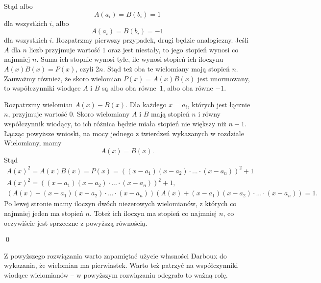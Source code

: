 \noindent
Stąd albo
\[
	A(a_i) = B(b_i) = 1
\]
dla wszystkich $i$, albo
\[
	A(a_i) = B(b_i) = -1
\]
dla wszystkich $i$.
Rozpatrzmy pierwszy przypadek, drugi będzie analogiczny.
Jeśli $A$ dla $n$ liczb przyjmuje wartość $1$ oraz jest niestały, to jego stopień wynosi co najmniej $n$. Suma ich stopnie wynosi tyle, ile wynosi stopień ich iloczynu $A(x)B(x) = P(x)$, czyli $2n$. Stąd też oba te wielomiany mają stopień $n$. Zauważmy również, że skoro wielomian $P(x) = A(x)B(x)$ jest unormowany, to współczynniki wiodące $A$ i $B$ są albo oba równe~$1$, albo oba równe $-1$.

\vspace{10px}
\noindent
Rozpatrzmy wielomian $A(x) - B(x)$. Dla każdego $x = a_i$, których jest łącznie $n$, przyjmuje wartość $0$. Skoro wielomiany $A$ i $B$ mają stopień $n$ i równy współczynnik wiodący, to ich różnica będzie miała stopień nie większy niż $n - 1$. Łącząc powyższe wnioski, na mocy jednego z twierdzeń wykazanych w rozdziale Wielomiany, mamy 
\[
	A(x) = B(x).
\]
Stąd
\begin{gather*}
	A(x)^2 = A(x)B(x) = P(x) = ((x − a_1)(x − a_2)\cdot ...\cdot (x − a_n))^2 + 1 \\
	A(x)^2 = ((x − a_1)(x − a_2)\cdot ...\cdot (x − a_n))^2 + 1, \\
	\left(A(x) - (x − a_1)(x − a_2)\cdot ...\cdot (x − a_n)\right)\left(A(x) + (x − a_1)(x − a_2)\cdot ...\cdot (x − a_n)\right) = 1.
\end{gather*}
Po lewej stronie mamy iloczyn dwóch niezerowych wielomianów, z których co najmniej jeden ma stopień $n$. Toteż ich iloczyn ma stopień co najmniej $n$, co oczywiście jest sprzeczne z powyższą równością.

\qed

\noindent
Z powyższego rozwiązania warto zapamiętać użycie własności Darboux do wykazania, że wielomian ma pierwiastek. Warto też patrzyć na współczynniki wiodące wielomianów -- w powyższym rozwiązaniu odegrało to ważną rolę.
\vspace{5px}
